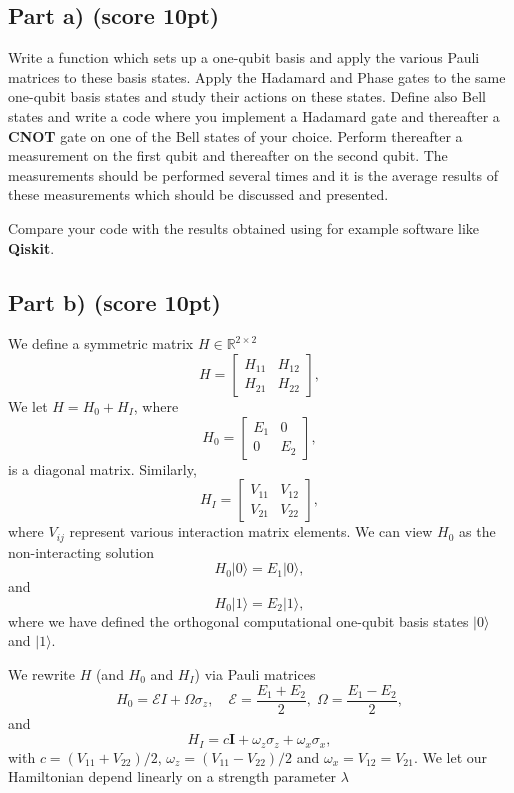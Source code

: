 \documentclass[%
oneside,                 %
final,                   %
10pt]{article}
\begin{document}
\subsection*{Part a) (score 10pt)}

Write a function which sets up a one-qubit basis and apply the various
Pauli matrices to these basis states.  Apply the Hadamard and Phase
gates to the same one-qubit basis states and study their actions on
these states. Define also Bell states and write a code where you
implement a Hadamard gate and thereafter a \textbf{CNOT} gate on one of the Bell
states of your choice. Perform thereafter a measurement on the first qubit and
thereafter on the second qubit. The measurements should be performed 
several times and it is the average results of these measurements
which should be discussed and presented.

Compare your code with the results obtained using for example software like \textbf{Qiskit}.

\subsection*{Part b) (score 10pt)}

We define a  symmetric matrix  $H\in {\mathbb{R}}^{2\times 2}$
\[
H = \begin{bmatrix} H_{11} & H_{12} \\ H_{21} & H_{22}
\end{bmatrix},
\]
We  let $H = H_0 + H_I$, where
\[
H_0= \begin{bmatrix} E_1 & 0 \\ 0 & E_2\end{bmatrix},
\]
is a diagonal matrix. Similarly,
\[
H_I= \begin{bmatrix} V_{11} & V_{12} \\ V_{21} & V_{22}\end{bmatrix},
\]
where $V_{ij}$ represent various interaction matrix elements.
We can view $H_0$ as the non-interacting solution
\begin{equation}
       H_0\vert 0 \rangle =E_1\vert 0 \rangle,
\end{equation}
and
\begin{equation}
       H_0\vert 1\rangle =E_2\vert 1\rangle,
\end{equation}
where we have defined the orthogonal computational one-qubit basis states $\vert 0\rangle$ and $\vert 1\rangle$.

We rewrite $H$ (and $H_0$ and $H_I$)  via Pauli matrices
\[
H_0 = \mathcal{E} I + \Omega \sigma_z, \quad \mathcal{E} = \frac{E_1
  + E_2}{2}, \; \Omega = \frac{E_1-E_2}{2},
\]
and
\[
H_I = c \bm{I} +\omega_z\sigma_z + \omega_x\sigma_x,
\]
with $c = (V_{11}+V_{22})/2$, $\omega_z = (V_{11}-V_{22})/2$ and $\omega_x = V_{12}=V_{21}$.
We let our Hamiltonian depend linearly on a strength parameter $\lambda$
\end{document}
